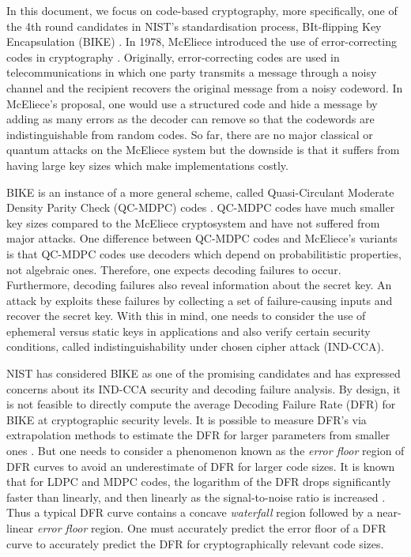 In this document, we focus on code-based cryptography, more specifically, one of the 4th round candidates in NIST's standardisation process, BIt-flipping Key Encapsulation (BIKE) \cite{BIKE}. In 1978, McEliece introduced the use of error-correcting codes in cryptography \cite{mceliece}. Originally, error-correcting codes are used in telecommunications in which one party transmits a message through a noisy channel and the recipient recovers the original message from a noisy codeword. In McEliece's proposal, one would use a structured code and hide a message by adding as many errors as the decoder can remove so that the codewords are indistinguishable from random codes. So far, there are no major classical or quantum attacks on the McEliece system but the downside is that it suffers from having large key sizes which make implementations costly.

BIKE is an instance of a more general scheme, called Quasi-Circulant Moderate Density Parity Check (QC-MDPC) codes \cite{QCMDPC}. QC-MDPC codes have much smaller key sizes compared to the McEliece cryptosystem and have not suffered from major attacks. One difference between QC-MDPC codes and McEliece's variants is that QC-MDPC codes use decoders which depend on probabilitistic properties, not algebraic ones. Therefore, one expects decoding failures to occur. Furthermore, decoding failures also reveal information about the secret key. An attack by \cite{GJS} exploits these failures by collecting a set of failure-causing inputs and recover the secret key. With this in mind, one needs to consider the use of ephemeral versus static keys in applications and also verify certain security conditions, called indistinguishability under chosen cipher attack (IND-CCA). 

NIST has considered BIKE as one of the promising candidates and has expressed concerns about its IND-CCA security and decoding failure analysis. By design, it is not feasible to directly compute the average Decoding Failure Rate (DFR) for BIKE at cryptographic security levels. It is possible to measure DFR's via extrapolation methods to estimate the DFR for larger parameters from smaller ones \cite{SV:2019:extrapolate,DGK20a}. But one needs to consider a phenomenon known as the \textit{error floor} region of DFR curves to avoid an underestimate of DFR for larger code sizes.  It is known that for LDPC and MDPC codes, the logarithm of the DFR drops significantly faster than linearly, and then linearly as the signal-to-noise ratio is increased \cite{bgf,Richardson03}. Thus a typical DFR curve contains a concave \textit{waterfall} region followed by a near-linear \textit{error floor} region. One must accurately predict the error floor of a DFR curve to accurately predict the DFR for cryptographically relevant code sizes.

